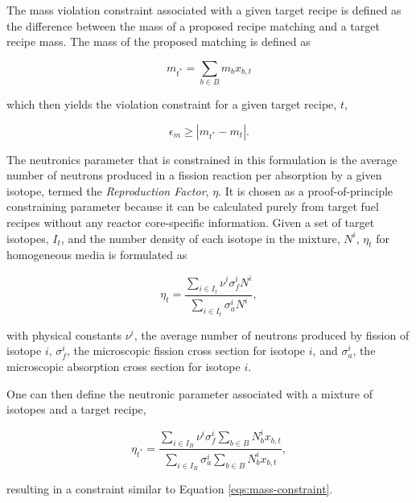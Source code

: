 The mass violation constraint associated with a given target recipe is defined
as the difference between the mass of a proposed recipe matching and a target
recipe mass. The mass of the proposed matching is defined as

\begin{equation}\label{eqs:mass-constraint}
m_{t^*} = \sum_{b \in B} m_{b} x_{b,t}
\end{equation}

which then yields the violation constraint for a given target recipe, $t$,

\begin{equation}\label{eqs:mass-constraint-simple}
\epsilon_{m} \geq \left| m_{t^*} - m_{t} \right|.
\end{equation}

The neutronics parameter that is constrained in this formulation is the average
number of neutrons produced in a fission reaction per absorption by a given
isotope, termed the \textit{Reproduction Factor}, $\eta$. It is chosen as a
proof-of-principle constraining parameter because it can be calculated purely
from target fuel recipes without any reactor core-specific information. Given a
set of target isotopes, $I_t$, and the number density of each isotope in the
mixture, $N^i$, $\eta_t$ for homogeneous media is formulated as

\begin{equation}
\label{eqs:eta_micro}
\eta_t = \frac{\sum_{i \in I_t} \nu^{i} \sigma_{f}^{i} N^{i}}
            {\sum_{i \in I_t} \sigma_{a}^{i} N^{i}},
\end{equation}

with physical constants $\nu^{i}$, the average number of neutrons produced by
fission of isotope $i$, $\sigma_{f}^{i}$, the microscopic fission cross section
for isotope $i$, and $\sigma_{a}^{i}$, the microscopic absorption cross section
for isotope $i$.

One can then define the neutronic parameter associated with a mixture of
isotopes and a target recipe,

\begin{equation}
\label{eqs:eta_fractions_nonlin}
\eta_{t^*} = \frac{\sum_{i \in I_{B}} \nu^{i} \sigma_{f}^{i} \sum_{b \in B} N_{b}^{i} x_{b,t}}
                {\sum_{i \in I_{B}} \sigma_{a}^{i} \sum_{b \in B} N_{b}^{i} x_{b,t}},
\end{equation}

resulting in a constraint similar to Equation \ref{eqs:mass-constraint}.

